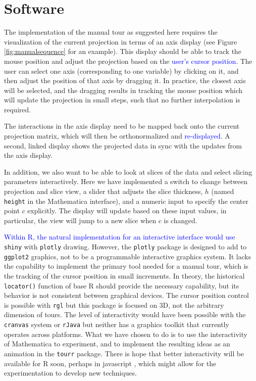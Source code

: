 \documentclass[]{interact}
\theoremstyle{plain}%
\theoremstyle{definition}
\theoremstyle{remark}
\begin{document}
\hypertarget{sec:implementation}{%
\section{Software}\label{sec:implementation}}

The implementation of the manual tour as suggested here requires the
visualization of the current projection in terms of an axis display (see
Figure \ref{fig:manualsequence} for an example). This display should be
able to track the mouse position and adjust the projection based on the
\textcolor{blue}{user's cursor position}. The user can select one axis
(corresponding to one variable) by clicking on it, and then adjust the
position of that axis by dragging it. In practice, the closest axis will
be selected, and the dragging results in tracking the mouse position
which will update the projection in small steps, such that no further
interpolation is required.

The interactions in the axis display need to be mapped back onto the
current projection matrix, which will then be orthonormalized and
\textcolor{blue}{re-displayed}. A second, linked display shows the
projected data in sync with the updates from the axis display.

In addition, we also want to be able to look at slices of the data and
select slicing parameters interactively. Here we have implemented a
switch to change between projection and slice view, a slider that
adjusts the slice thickness, \(h\) (named \texttt{height} in the
Mathematica interface), and a numeric input to specify the center point
\(c\) explicitly. The display will update based on these input values,
in particular, the view will jump to a new slice when \(c\) is changed.

\textcolor{blue}{Within R, the natural implementation for an interactive interface would use}
\texttt{shiny} \citep{shinym} with \texttt{plotly} \citep{plotly}
drawing. However, the \texttt{plotly} package is designed to add to
\texttt{ggplot2} \citep{ggplot2} graphics, not to be a programmable
interactive graphics system. It lacks the capability to implement the
primary tool needed for a manual tour, which is the tracking of the
cursor position in small increments. In theory, the historical
\texttt{locator()} function of base R should provide the necessary
capability, but its behavior is not consistent between graphical
devices. The cursor position control is possible with \texttt{rgl}
\citep{rgl} but this package is focused on 3D, not the arbitrary
dimension of tours. The level of interactivity would have been possible
with the \texttt{cranvas} system \citep{cranvas} or \texttt{rJava}
\citep{rJava} but neither has a graphics toolkit that currently operates
across platforms. What we have chosen to do is to use the interactivity
of Mathematica to experiment, and to implement the resulting ideas as an
animation in the \texttt{tourr} \citep{tourr} package. There is hope
that better interactivity will be available for R soon, perhaps in
javascript \citep[e.g.][\citet{detourr}]{langevitour}, which might allow
for the experimentation to develop new techniques.
\end{document}
